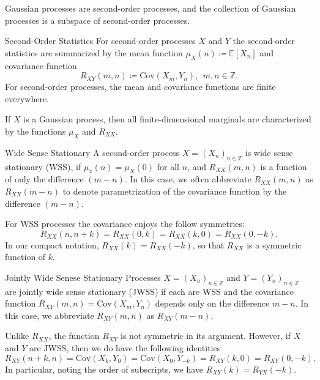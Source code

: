 \documentclass{article}
\begin{document}
\begin{exmp}{}{}
    Gaussian processes are second-order processes, and the collection of Gaussian processes is a subspace of second-order processes.
\end{exmp}

\begin{defn}{Second-Order Statistics}{}
For second-order processes \( X \) and \( Y \) the second-order statistics are summarized by the mean function \( \mu _{X} (n) \coloneqq \mathbb{E} [X_{n} ] \) and covariance function
\[
    R_{XY} (m,n) \coloneqq \mathrm{Cov} (X_{m} ,Y_{n} ), \ \ m,n \in \mathbb{Z} .
\]
For second-order processes, the mean and covariance functions are finite everywhere.
\end{defn}
\begin{exmp}{}{}
    If $X$ is a Gaussian process, then all finite-dimensional marginals
    are characterized by the functions $\mu_ X$ and $R_{XX} $.
\end{exmp}

\begin{defn}{Wide Sense Stationary}{}
A second-order process \( X = (X_{n} )_{n\in \mathbb{Z} }  \) is wide sense stationary (WSS), if \( \mu _{x} (n) = \mu _{X} (0)\) for all \( n \), and \( R_{XX}(m,n)  \) is a function of only the difference $(m-n)$. In this case, we often abbreviate \( R_{X  X}(m,n) \) as \( R_{X X}(m - n) \) to denote parametrization of the covariance function by the difference \( (m - n) \). 
\end{defn}

\begin{rmk}{}{}
For WSS processes the covariance enjoys the follow symmetries:
\[
    R_{XX} (n,n + k) = R_{X X}(0,k) = R_{X X}(k, 0) = R _{X X}(0,- k).
\]
In our compact notation, \( R_{X X}(k)= R_{X X}(-k) \), so that \(  R_{X X} \) is a symmetric function of \( k \). 
\end{rmk}

\begin{defn}{Jointly Wide Senese Stationary}{}
    Processes \( X = (X_{n} )_{n \in \mathbb{Z}}  \) and \( Y = (Y_{n} )_{n \in \mathbb{Z}} \) are jointly wide sense stationary (JWSS) if each are WSS and the covariance function \( R_{XY} (m,n) = \mathrm{Cov} (X_{m}, Y_{n} )\) depends only on the difference \( m - n \). In this case, we abbreviate \( R_{XY} (m,n) \) as \( R_{XY}(m - n)  \). 

\end{defn}
\begin{rmk}{}{}
    Unlike \( R_{X X} \), the function \( R_{XY} \) is not symmetric in its argument. However, if \( X \) and \( Y \) are JWSS, then we do have the following identities
    \[
        R_{XY} (n + k, n) = \mathrm{Cov} (X_{k} , Y_0) = \mathrm{Cov} (X_{0} , Y_ {- k} ) = R_{XY}(k,0) = R_{XY} (0,- k).  
    \]
    In particular, noting the order of subscripts, we have \( R_{XY} (k) = R_{YX} (- k) \). 
\end{rmk}
\end{document}
